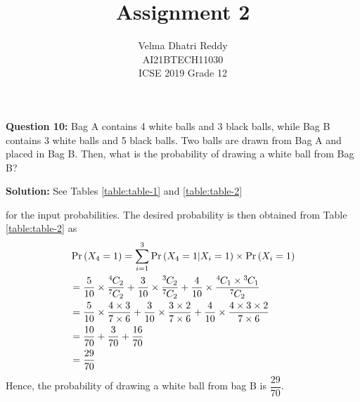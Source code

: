 \documentclass[journal,12pt,twocolumn]{IEEEtran}
\title{Assignment 2}
\author{Velma Dhatri Reddy \\ \normalsize AI21BTECH11030 \\ \vspace*{10pt} \Large ICSE 2019 Grade 12}
\providecommand{\pr}[1]{\ensuremath{\Pr\left(#1\right)}}
\newcommand*{\permcomb}[4][0mu]{{{}^{#3}\mkern#1#2_{#4}}}
\newcommand*{\comb}[1][-1mu]{\permcomb[#1]{C}}
\begin{document}
\maketitle
\textbf{Question 10:}
Bag A contains 4 white balls and 3 black balls, while Bag B contains 3 white balls and 5 black balls. Two balls are drawn from Bag A and placed in Bag B. Then, what is the probability of drawing a white ball from Bag B?

\textbf{Solution:} See Tables 
	\eqref{table:table-1}
	and 
	\eqref{table:table-2}
\begin{table}[ht!]
	
	\vspace*{5pt}
\caption{}
	\label{table:table-1}
\end{table}
\begin{table}[ht!]
	
	\vspace*{5pt}
\caption{}
	\label{table:table-2}
\end{table}
for the input probabilities.
The desired probability is then obtained from Table \eqref{table:table-2} as
\begin{align}
    &\pr{X_4 = 1} = \sum_{i=1}^{3} \pr{X_4 = 1|X_i=1}\times\pr{X_i=1}\\
    &= \dfrac{5}{10}\times\dfrac{\comb{4}{2}}{\comb{7}{2}} + \dfrac{3}{10}\times\dfrac{\comb{3}{2}}{\comb{7}{2}}  + \dfrac{4}{10}\times\dfrac{\comb{4}{1}\times\comb{3}{1}}{\comb{7}{2}}\\
    &= \dfrac{5}{10}\times\dfrac{4\times3}{7\times6} + \dfrac{3}{10}\times\dfrac{3\times2}{7\times6} +  \dfrac{4}{10}\times\dfrac{4\times3\times2}{7\times6}\\
    &= \dfrac{10}{70} + \dfrac{3}{70} + \dfrac{16}{70} \\
    &= \dfrac{29}{70}
\end{align}
Hence, the probability of drawing a white ball from bag B is $\dfrac{29}{70}$.
\end{document}
